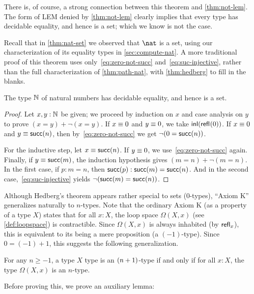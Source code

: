 There is, of course, a strong connection between this theorem and \autoref{thm:not-lem}.
The form of LEM denied by \autoref{thm:not-lem} clearly implies that every type has decidable equality, and hence is a set; which we know is
not the case.

Recall that in \autoref{thm:nat-set} we observed that $\nat$ is a set, using our characterization of its equality types in
\autoref{sec:compute-nat}.
A more traditional proof of this theorem uses only~\eqref{eq:zero-not-succ} and~\eqref{eq:suc-injective}, rather than the full
characterization of \autoref{thm:path-nat}, with \autoref{thm:hedberg} to fill in the blanks.

\begin{thm}\label{prop:nat-is-set}
 The type $\mathbb{N}$ of natural numbers has decidable equality, and hence is a set.
\end{thm}

\begin{proof}
  Let $x, y : \mathbb{N}$ be given; we proceed by induction on $x$ and case analysis on $y$ to prove $(x=y)+\neg(x=y)$.
  If $x \equiv 0$ and $y \equiv 0$, we take ${\mathsf{inl}}(\mathsf{refl}_{}(0))$.
  If $x \equiv 0$ and $y \equiv \mathsf{succ}(n)$, then by~\eqref{eq:zero-not-succ} we get $\neg (0 = \mathsf{succ} (n))$.

  For the inductive step, let $x \equiv \mathsf{succ} (n)$.
  If $y \equiv 0$, we use~\eqref{eq:zero-not-succ} again.
  Finally, if $y \equiv \mathsf{succ} (m)$, the induction hypothesis gives $(m = n)+\neg(m = n)$.
  In the first case, if $p:m=n$, then ${\mathsf{succ}}({p}):\mathsf{succ}(m)=\mathsf{succ}(n)$.
  And in the second case,~\eqref{eq:suc-injective} yields $\neg(\mathsf{succ}(m)=\mathsf{succ}(n))$.
\end{proof}

Although Hedberg's theorem appears rather special to sets ($0$-types), ``Axiom K'' generalizes naturally to $n$-types.
Note that the ordinary Axiom K (as a property of a type $X$) states that for all $x:X$, the loop space $\Omega(X,x)$ (see \cref{def:loopspace}) is contractible.
Since $\Omega(X,x)$ is always inhabited (by $\mathsf{refl}_{x}$), this is equivalent to its being a mere proposition (a $(-1)$-type).
Since $0 = (-1)+1$, this suggests the following generalization.

\begin{thm}\label{thm:hlevel-loops}
  For any $n\geq -1$, a type $X$ type is an $(n+1)$-type if and only if for all $x : X$, the type $\Omega(X, x)$ is an $n$-type.
\end{thm}

Before proving this, we prove an auxiliary lemma:


